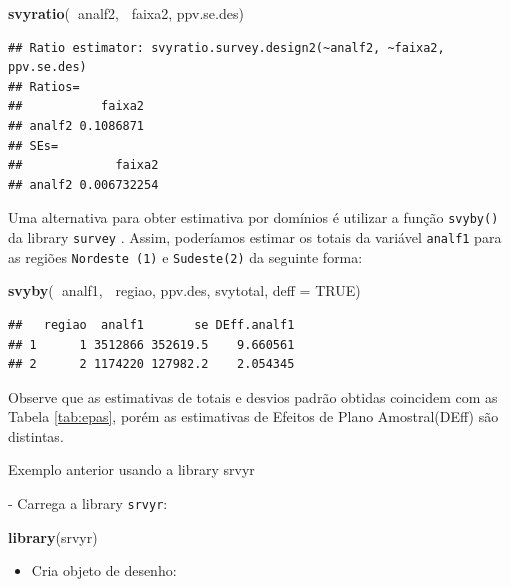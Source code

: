\documentclass[]{book}
\newenvironment{Shaded}{\begin{snugshade}}{\end{snugshade}}
\newcommand{\KeywordTok}[1]{\textcolor[rgb]{0.13,0.29,0.53}{\textbf{#1}}}
\newcommand{\DataTypeTok}[1]{\textcolor[rgb]{0.13,0.29,0.53}{#1}}
\newcommand{\OtherTok}[1]{\textcolor[rgb]{0.56,0.35,0.01}{#1}}
\newcommand{\OperatorTok}[1]{\textcolor[rgb]{0.81,0.36,0.00}{\textbf{#1}}}
\newcommand{\NormalTok}[1]{#1}
\providecommand{\tightlist}{%
  \setlength{\itemsep}{0pt}\setlength{\parskip}{0pt}}
\theoremstyle{definition}
\theoremstyle{definition}
\theoremstyle{definition}
\theoremstyle{remark}
\let\BeginKnitrBlock\begin \let\EndKnitrBlock\end
\begin{document}
\begin{Shaded}
\begin{Highlighting}[]
\KeywordTok{svyratio}\NormalTok{(}\OperatorTok{~}\NormalTok{analf2, }\OperatorTok{~}\NormalTok{faixa2, ppv.se.des)}
\end{Highlighting}
\end{Shaded}

\begin{verbatim}
## Ratio estimator: svyratio.survey.design2(~analf2, ~faixa2, ppv.se.des)
## Ratios=
##           faixa2
## analf2 0.1086871
## SEs=
##             faixa2
## analf2 0.006732254
\end{verbatim}

Uma alternativa para obter estimativa por domínios é utilizar a função
\texttt{svyby()} da library \texttt{survey} \citep{R-survey}. Assim,
poderíamos estimar os totais da variável \texttt{analf1} para as regiões
\texttt{Nordeste\ (1)} e \texttt{Sudeste(2)} da seguinte forma:

\begin{Shaded}
\begin{Highlighting}[]
\KeywordTok{svyby}\NormalTok{(}\OperatorTok{~}\NormalTok{analf1, }\OperatorTok{~}\NormalTok{regiao, ppv.des, svytotal, }\DataTypeTok{deff =} \OtherTok{TRUE}\NormalTok{)}
\end{Highlighting}
\end{Shaded}

\begin{verbatim}
##   regiao  analf1       se DEff.analf1
## 1      1 3512866 352619.5    9.660561
## 2      2 1174220 127982.2    2.054345
\end{verbatim}

Observe que as estimativas de totais e desvios padrão obtidas coincidem
com as Tabela \ref{tab:epas}, porém as estimativas de Efeitos de Plano
Amostral(DEff) são distintas.

\BeginKnitrBlock{example}
\protect\hypertarget{exm:exe13}{}{\label{exm:exe13} }Exemplo anterior usando
a library srvyr
\EndKnitrBlock{example} - Carrega a library \texttt{srvyr}:

\begin{Shaded}
\begin{Highlighting}[]
\KeywordTok{library}\NormalTok{(srvyr)}
\end{Highlighting}
\end{Shaded}

\begin{itemize}
\tightlist
\item
  Cria objeto de desenho:
\end{itemize}
\end{document}
